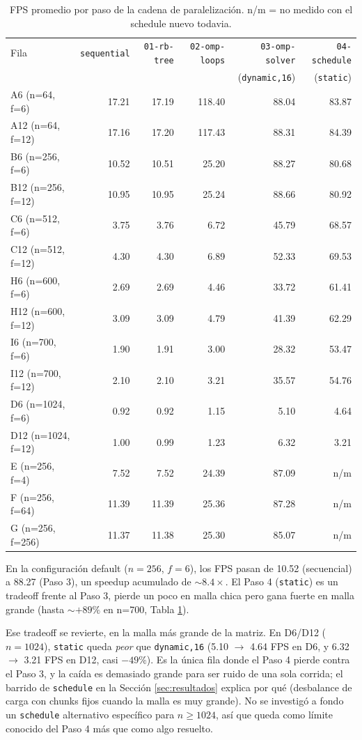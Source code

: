 \documentclass[11pt]{article}
\begin{document}
\begin{table}[ht]
\centering
\small
\begin{tabular}{lrrrrr}
\toprule
Fila & \texttt{sequential} & \texttt{01-rb-tree} & \texttt{02-omp-loops} & \texttt{03-omp-solver} & \texttt{04-schedule} \\
& & & & (\texttt{dynamic,16}) & (\texttt{static}) \\
\midrule
A6 (n=64, f=6)    & 17.21 & 17.19 & 118.40 & 88.04 & 83.87 \\
A12 (n=64, f=12)  & 17.16 & 17.20 & 117.43 & 88.31 & 84.39 \\
B6 (n=256, f=6)   & 10.52 & 10.51 & 25.20  & 88.27 & 80.68 \\
B12 (n=256, f=12) & 10.95 & 10.95 & 25.24  & 88.66 & 80.92 \\
C6 (n=512, f=6)   & 3.75  & 3.76  & 6.72   & 45.79 & 68.57 \\
C12 (n=512, f=12) & 4.30  & 4.30  & 6.89   & 52.33 & 69.53 \\
H6 (n=600, f=6)   & 2.69  & 2.69  & 4.46   & 33.72 & 61.41 \\
H12 (n=600, f=12) & 3.09  & 3.09  & 4.79   & 41.39 & 62.29 \\
I6 (n=700, f=6)   & 1.90  & 1.91  & 3.00   & 28.32 & 53.47 \\
I12 (n=700, f=12) & 2.10  & 2.10  & 3.21   & 35.57 & 54.76 \\
D6 (n=1024, f=6)  & 0.92  & 0.92  & 1.15   & 5.10  & 4.64  \\
D12 (n=1024, f=12)& 1.00  & 0.99  & 1.23   & 6.32  & 3.21  \\
E (n=256, f=4)    & 7.52  & 7.52  & 24.39  & 87.09 & n/m \\
F (n=256, f=64)   & 11.39 & 11.39 & 25.36  & 87.28 & n/m \\
G (n=256, f=256)  & 11.37 & 11.38 & 25.30  & 85.07 & n/m \\
\bottomrule
\end{tabular}
\caption{FPS promedio por paso de la cadena de paralelización. n/m = no
medido con el schedule nuevo todavia.}
\label{tab:master}
\end{table}

En la configuración default ($n=256$, $f=6$), los FPS pasan de 10.52
(secuencial) a 88.27 (Paso 3), un speedup acumulado de $\sim 8.4\times$.
El Paso 4 (\texttt{static}) es un tradeoff frente al Paso 3, pierde un
poco en malla chica pero gana fuerte en malla grande (hasta
$\sim +89\%$ en n=700, Tabla \ref{tab:master}).

Ese tradeoff se revierte, en la malla más grande de la
matriz. En D6/D12 ($n=1024$), \texttt{static} queda \emph{peor} que
\texttt{dynamic,16} (5.10 $\to$ 4.64 FPS en D6, y 6.32 $\to$ 3.21 FPS en
D12, casi $-49\%$). Es la única fila donde el Paso 4 pierde contra el Paso 3, y
la caída es demasiado grande para ser ruido de una sola corrida; el
barrido de \texttt{schedule} en la Sección \ref{sec:resultados} explica
por qué (desbalance de carga con chunks fijos cuando la malla es muy
grande). No se investigó a fondo un \texttt{schedule} alternativo
específico para $n \geq 1024$, así que queda como límite conocido del
Paso 4 más que como algo resuelto.
\end{document}
